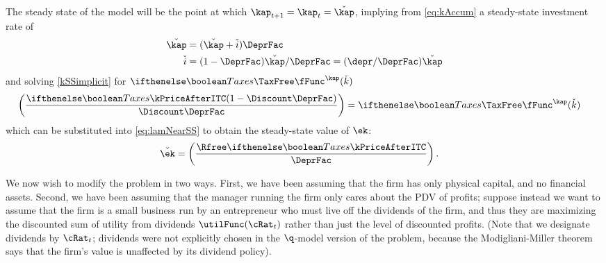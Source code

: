 {The steady state of the model will be the point at which $\kap_{t+1}=\kap_{t}=\check{\kap}$,
implying from \eqref{eq:kAccum} a steady-state investment rate of
\begin{equation}\begin{gathered}\begin{aligned}
  \check{\kap} & =  (\check{\kap}+\check{i})\DeprFac
\\ \check{i} & =  (1-\DeprFac)\check{\kap}/\DeprFac = (\depr/\DeprFac) \check{\kap}
\label{eq:iSS}
\end{aligned}\end{gathered}\end{equation}
and solving \eqref{kSSimplicit} for $ \ifTax{\TaxFree}{}\fFunc^{\kap}(\check{k})$
\begin{equation}\begin{gathered}\begin{aligned}
 \left(\frac{\ifTax{\kPriceAfterITC}{}(1 - \Discount\DeprFac)}{\Discount \DeprFac}\right) & =   \ifTax{\TaxFree}{}\fFunc^{\kap}(\check{k})
\end{aligned}\end{gathered}\end{equation}
which can be substituted into \eqref{eq:lamNearSS} to obtain the steady-state
value of $\ek$:
\begin{equation}\begin{gathered}\begin{aligned}
\check{\ek} & =   \left(\frac{\Rfree \ifTax{\kPriceAfterITC}{}}{\DeprFac}\right) .
\end{aligned}\end{gathered}\end{equation}

}{\AnswerOrBlankSpace{\clearpage\vfill\eject}{\vspace{0.0in}}}{}


We now wish to modify the problem in two ways.  First, we have been
assuming that the firm has only physical capital, and no financial
assets.  Second, we have been assuming that the manager running the
firm only cares about the PDV of profits; suppose instead we want to
assume that the firm is a small business run by an entrepreneur who
must live off the dividends of the firm, and thus they are maximizing
the discounted sum of utility from dividends $\utilFunc(\cRat_t)$
rather than just the level of discounted profits.  (Note that we
designate dividends by $\cRat_{t}$; dividends were not explicitly
chosen in the $\q$-model version of the problem, because the
Modigliani-Miller theorem says that the firm's value is unaffected by
its dividend policy).

